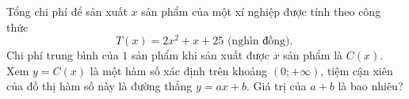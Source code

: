 \begin{ex}%
	Tổng chi phí để sản xuất $x$ sản phẩm của một xí nghiệp được tính theo công thức
	\[T(x)=2 x^2+x+25 \text { (nghìn đồng). }\]
	Chi phí trung bình của $1$ sản phẩm khi sản xuất được $x$ sản phẩm là $C(x)$. Xem $y=C(x)$ là một hàm số xác định trên khoảng $(0 ;+\infty)$, tiệm cận xiên của đồ thị hàm số này là đường thẳng $y=ax+b$. Giá trị của $a+b$ là bao nhiêu?
\end{ex}

